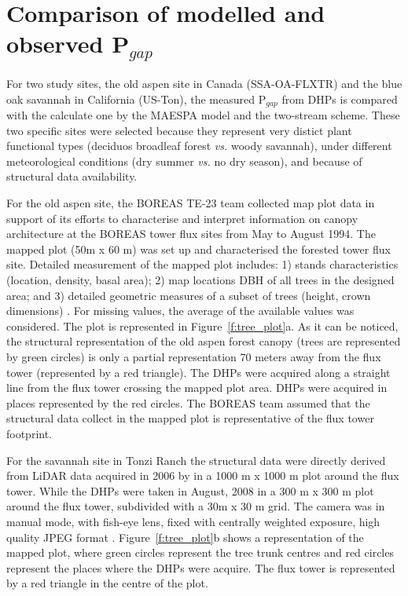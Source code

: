 \documentclass[a4paper,11pt]{report}
\begin{document}
\section{Comparison of modelled and observed P$_{gap}$}\label{section:MAESPA_build}

For two study sites, the old aspen site in Canada (SSA-OA-FLXTR) and the blue oak savannah in California (US-Ton), the measured P$_{gap}$ from DHPs is compared with the calculate one by the MAESPA model and the two-stream scheme. These two specific sites were selected because they represent very distict plant functional types (deciduos broadleaf forest \textit{vs.} woody savannah), under different meteorological conditions (dry summer \textit{vs.} no dry season), and because of structural data availability. 

For the old aspen site, the BOREAS TE-23 team collected map plot data in support of its efforts to characterise and interpret information on canopy architecture at the BOREAS tower flux sites from May to August 1994. The mapped plot (50m x 60 m) was set up and characterised the forested tower flux site. Detailed measurement of the mapped plot includes: 1) stands characteristics (location, density, basal area); 2) map locations DBH of all trees in the designed area; and 3) detailed geometric measures of a subset of trees (height, crown dimensions) \citep{Rich1999b}. For missing values, the average of the available values was considered. The plot is represented in Figure~\ref{f:tree_plot}a. As it can be noticed, the structural representation of the old aspen forest canopy (trees are represented by green circles) is only a partial representation 70 meters away from the flux tower (represented by a red triangle). The DHPs were acquired along a straight line from the flux tower crossing the mapped plot area. DHPs were acquired in places represented by the red circles. The BOREAS team assumed that the structural data collect in the mapped plot is representative of the flux tower footprint.

For the savannah site in Tonzi Ranch the structural data were directly derived from LiDAR data acquired in 2006 by \citep{Chen2006} in a 1000 m x 1000 m plot around the flux tower. While the DHPs were taken in August, 2008 in a 300 m x 300 m plot around the flux tower, subdivided with a 30m x 30 m grid. The camera was in manual mode, with fish-eye lens, fixed with centrally weighted exposure, high quality JPEG format \citep{Ryu2010}. Figure~\ref{f:tree_plot}b shows a representation of the mapped plot, where green circles represent the tree trunk centres and red circles represent the places where the DHPs were acquire. The flux tower is represented by a red triangle in the centre of the plot.
\end{document}
